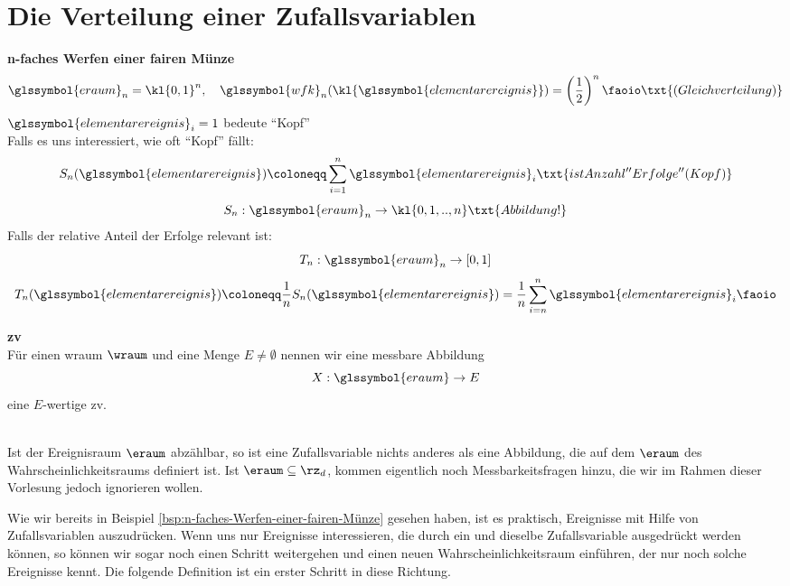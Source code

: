 \section{Die Verteilung einer Zufallsvariablen}\label{sec:die-verteilung-einer-zufallsvariablen}
\begin{bsp}
    \textbf{n-faches Werfen einer fairen Münze} \label{bsp:n-faches-Werfen-einer-fairen-Münze}   \\
    \[
        \glssymbol{eraum} _n = \kl{0,1}^n, \quad \glssymbol{wfk}_n (\kl{\glssymbol{elementarereignis}}) = \left(\frac{1}{2}\right)^n \faoio \txt{(Gleichverteilung)}
    \]
    $\glssymbol{elementarereignis}_i = 1$ bedeute ``Kopf'' \\
    Falls es uns interessiert, wie oft ``Kopf'' fällt:
    \[
        S_n(\glssymbol{elementarereignis}) \coloneqq  \sum^n_{i=1}     \glssymbol{elementarereignis}_i \txt{ist Anzahl ''Erfolge'' (Kopf)}
    \]
    \[
        S_n :\glssymbol{eraum} _n \rightarrow \kl{0,1,..,n} \txt{Abbildung!}
    \]
    Falls der relative Anteil der Erfolge relevant ist:
    \[
        T_n: \glssymbol{eraum} _n \rightarrow [0,1]
    \]
    \[
        T_n (\glssymbol{elementarereignis}) \coloneqq  \frac{1}{n} S_n (\glssymbol{elementarereignis}) = \frac{1}{n} \sum^n_{i=n} \glssymbol{elementarereignis}_i \faoio
    \]
\end{bsp}


\begin{defi}
    \label{def:zv}
    \textbf{\gls{zv}}   \\
    Für einen \gls{wraum} $\wraum$ und eine Menge $E \neq \emptyset$ nennen wir eine messbare Abbildung
    \[
        X: \glssymbol{eraum}  \rightarrow E
    \]
    eine $E$-wertige \gls{zv}.
\end{defi}



\begin{bem}     \\
Ist der Ereignisraum $\eraum$ abzählbar, so ist eine Zufallsvariable nichts anderes als eine Abbildung, die auf
dem $\eraum$ des Wahrscheinlichkeitsraums definiert ist. Ist $\eraum \subseteq \rz_d$, kommen eigentlich noch
Messbarkeitsfragen hinzu, die wir im Rahmen dieser Vorlesung jedoch ignorieren wollen.

Wie wir bereits in Beispiel \autoref{bsp:n-faches-Werfen-einer-fairen-Münze} gesehen haben, ist es praktisch,
Ereignisse mit Hilfe von Zufallsvariablen auszudrücken. Wenn uns nur Ereignisse interessieren, die durch ein und dieselbe Zufallsvariable
ausgedrückt werden können, so können wir sogar noch einen Schritt weitergehen und einen neuen
Wahrscheinlichkeitsraum einführen, der nur noch solche Ereignisse kennt. Die folgende Definition ist
ein erster Schritt in diese Richtung.
\end{bem}

